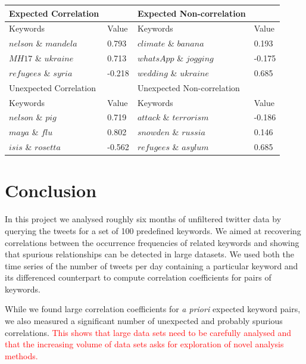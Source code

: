\documentclass[12pt, a4paper]{article}
\begin{document}
\begin{minipage}{\linewidth}
	\centering
	\label{tab:example_corr} 
	\begin{tabular}{ | l | l || l | l |}
		\hline
		Expected Correlation &  & Expected Non-correlation & \\ \hline
		Keywords & Value & Keywords & Value \\ \hline
		$nelson$ \& $mandela$ & 0.793 & $climate$ \& $banana$ & 0.193\\
		$MH17$ \& $ukraine$ & 0.713 & $whatsApp$ \& $jogging$ & -0.175\\
		$refugees$ \& $syria$ & -0.218 & $wedding$ \& $ukraine$ & 0.685\\ \hline \hline
		
		Unexpected Correlation &  & Unexpected Non-correlation & \\ \hline
		Keywords & Value & Keywords & Value \\ \hline
		$nelson$ \& $pig$ & 0.719 & $attack$ \& $terrorism$ & -0.186\\
		$maya$ \& $flu$ & 0.802 & $snowden$ \& $russia$ &  0.146\\
		$isis$ \& $rosetta$ & -0.562 & $refugees$ \& $asylum$ & 0.685\\ \hline
	\end{tabular}
\end{minipage}


\section{Conclusion}
In this project we analysed roughly six months of unfiltered twitter data by querying the tweets for a set of 100 predefined keywords. We aimed at recovering correlations between the occurrence frequencies of related keywords and showing that spurious relationships can be detected in large datasets. We used both the time series of the number of tweets per day containing a particular keyword and its differenced counterpart to compute correlation coefficients for pairs of keywords. 

While we found large correlation coefficients for \textit{a priori} expected keyword pairs, we also measured a significant number of unexpected and probably spurious correlations. \textcolor{red}{This shows that large data sets need to be carefully analysed and that the increasing volume of data sets asks for exploration of novel analysis methods.}
\end{document}
